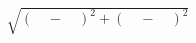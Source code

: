 \documentclass[preview]{standalone}
\begin{document}
\begin{align*}
\sqrt{ ( \quad - \quad ) ^{2} + ( \quad - \quad ) ^{2}}
\end{align*}
\end{document}
